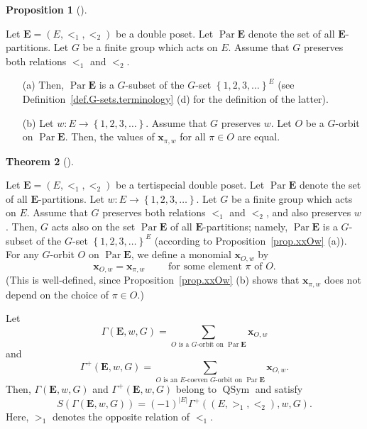 \documentclass[numbers=enddot,12pt,final,onecolumn,notitlepage,abstracton]{scrartcl}%
\theoremstyle{definition}
\newtheorem{theo}{Theorem}[section]
\newenvironment{theorem}[1][]
{\begin{theo}[#1]\begin{leftbar}}
{\end{leftbar}\end{theo}}
\newtheorem{prop}[theo]{Proposition}
\newenvironment{proposition}[1][]
{\begin{prop}[#1]\begin{leftbar}}
{\end{leftbar}\end{prop}}
\let\sumnonlimits\sum
\renewcommand{\sum}{\sumnonlimits\limits}
\newcommand{\xx}{{\mathbf{x}}}
\newcommand{\QSym}{{\operatorname{QSym}}}
\newcommand{\Par}{\operatorname{Par}}
\newcommand{\EE}{{\mathbf{E}}}
\begin{document}
\begin{proposition}
\label{prop.xxOw}
Let $\EE = \left(E, <_1, <_2\right)$ be a double poset.
Let $\Par \EE$ denote the set of all $\EE$-partitions.
Let $G$ be a finite
group which acts on $E$. Assume that $G$ preserves both
relations $<_1$ and $<_2$.

\begin{enumerate}

\item[(a)]
Then, $\Par \EE$ is a $G$-subset of the $G$-set
$\left\{1, 2, 3, \ldots\right\}^E$ (see
Definition~\ref{def.G-sets.terminology} (d) for the definition of
the latter).

\item[(b)] Let $w : E \to \left\{1, 2, 3, \ldots\right\}$. Assume that
$G$ preserves $w$.
Let $O$ be a $G$-orbit on $\Par \EE$. Then, the values of $\xx_{\pi, w}$
for all $\pi \in O$ are equal.

\end{enumerate}

\end{proposition}

\begin{theorem}
\label{thm.antipode.GammawG}
Let $\EE = \left(E, <_1, <_2\right)$ be a tertispecial double poset.
Let $\Par \EE$ denote the set of all $\EE$-partitions.
Let $w : E \to \left\{1, 2, 3, \ldots\right\}$. Let $G$ be a finite
group which acts on $E$. Assume that $G$ preserves both
relations $<_1$ and $<_2$, and also preserves $w$.
Then, $G$ acts also on the set $\Par \EE$ of all
$\EE$-partitions; namely, $\Par \EE$ is a $G$-subset of the $G$-set
$\left\{1, 2, 3, \ldots\right\}^E$ (according to
Proposition~\ref{prop.xxOw} (a)).
For any $G$-orbit $O$ on $\Par \EE$, we define a monomial $\xx_{O, w}$
by
\[ \xx_{O, w} = \xx_{\pi, w} \qquad \text{ for some element }
\pi \text{ of } O .
\]
(This is well-defined, since Proposition~\ref{prop.xxOw} (b) shows
that $\xx_{\pi, w}$ does not depend on the choice of $\pi \in O$.)

Let
\[
\Gamma\left(\EE, w, G\right) = \sum_{O\text{ is a }
G\text{-orbit on } \Par \EE} \xx_{O, w}
\]
and
\[
\Gamma^+\left(\EE, w, G\right) = \sum_{O\text{ is an }E\text{-coeven }
G\text{-orbit on } \Par \EE} \xx_{O, w} .
\]
Then, $\Gamma\left(\EE, w, G\right)$ and
$\Gamma^+\left(\EE, w, G\right)$ belong to $\QSym$ and satisfy
\[
S\left(\Gamma\left(\EE, w, G\right)\right)
= \left(-1\right)^{\left|E\right|}
\Gamma^+\left(\left(E, >_1, <_2\right), w, G\right) .
\]
Here, $>_1$ denotes the opposite relation of $<_1$.
\end{theorem}
\end{document}
